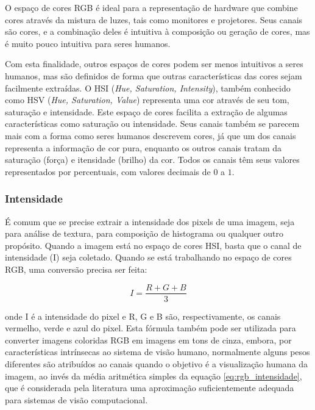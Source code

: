 O espaço de cores RGB é ideal para a representação de hardware que combine cores através da mistura de luzes, tais como monitores e projetores. Seus canais são cores, e a combinação deles é intuitiva à composição ou geração de cores, mas é muito pouco intuitiva para seres humanos.

Com esta finalidade, outros espaços de cores podem ser menos intuitivos a seres humanos, mas são definidos de forma que outras características das cores sejam facilmente extraídas. O HSI (\textit{Hue, Saturation, Intensity}), também conhecido como HSV (\textit{Hue, Saturation, Value}) representa uma cor através de seu tom, saturação e intensidade. Este espaço de cores facilita a extração de algumas características como saturação ou intensidade. Seus canais também se parecem mais com a forma como seres humanos descrevem cores, já que um dos canais representa a informação de cor pura, enquanto os outros canais tratam da saturação (força) e itensidade (brilho) da cor. Todos os canais têm seus valores representados por percentuais, com valores decimais de $0$ a $1$.

%

\subsubsection*{Intensidade}

É comum que se precise extrair a intensidade dos pixels de uma imagem, seja para análise de textura, para composição de histograma ou qualquer outro propósito. Quando a imagem está no espaço de cores HSI, basta que o canal de intensidade (I) seja coletado. Quando se está trabalhando no espaço de cores RGB, uma conversão precisa ser feita:

\begin{equation}
	\displaystyle I = \frac{R + G + B}{3}
	\label{eq:rgb_intensidade}
\end{equation}

onde I é a intensidade do pixel e R, G e B são, respectivamente, os canais vermelho, verde e azul do pixel. Esta fórmula também pode ser utilizada para converter imagens coloridas RGB em imagens em tons de cinza, embora, por características intrínsecas ao sistema de visão humano, normalmente alguns pesos diferentes são atribuídos ao canais quando o objetivo é a visualização humana da imagem, ao invés da média aritmética simples da equação \ref{eq:rgb_intensidade}, que é considerada pela literatura uma aproximação suficientemente adequada para sistemas de visão computacional.

